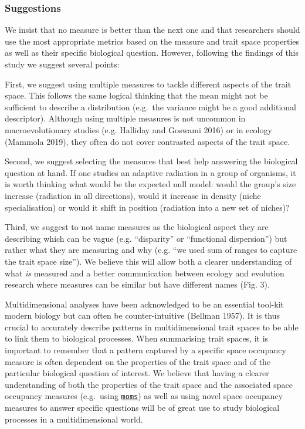 \documentclass[]{article}
\begin{document}
\subsubsection{Suggestions}\label{suggestions}

We insist that no measure is better than the next one and that
researchers should use the most appropriate metrics based on the measure
and trait space properties as well as their specific biological
question. However, following the findings of this study we suggest
several points:

First, we suggest using multiple measures to tackle different aspects of
the trait space. This follows the same logical thinking that the mean
might not be sufficient to describe a distribution (e.g.~the variance
might be a good additional descriptor). Although using multiple measures
is not uncommon in macroevolutionary studies (e.g. Halliday and Goswami
2016) or in ecology (Mammola 2019), they often do not cover contrasted
aspects of the trait space.

Second, we suggest selecting the measures that best help answering the
biological question at hand. If one studies an adaptive radiation in a
group of organisms, it is worth thinking what would be the expected null
model: would the group's size increase (radiation in all directions),
would it increase in density (niche specialisation) or would it shift in
position (radiation into a new set of niches)?

Third, we suggest to not name measures as the biological aspect they are
describing which can be vague (e.g. ``disparity'' or ``functional
dispersion'') but rather what they are measuring and why (e.g. ``we used
sum of ranges to capture the trait space size''). We believe this will
allow both a clearer understanding of what \emph{is} measured and a
better communication between ecology and evolution research where
measures can be similar but have different names (Fig. 3).

Multidimensional analyses have been acknowledged to be an essential
tool-kit modern biology but can often be counter-intuitive (Bellman
1957). It is thus crucial to accurately describe patterns in
multidimensional trait spaces to be able to link them to biological
processes. When summarising trait spaces, it is important to remember
that a pattern captured by a specific space occupancy measure is often
dependent on the properties of the trait space and of the particular
biological question of interest. We believe that having a clearer
understanding of both the properties of the trait space and the
associated space occupancy measures (e.g.~using
\href{https://tguillerme.shinyapps.io/moms/}{\texttt{moms}}) as well as
using novel space occupancy measures to answer specific questions will
be of great use to study biological processes in a multidimensional
world.
\end{document}
